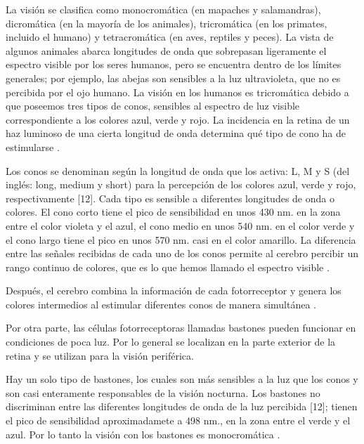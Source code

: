 \documentclass[10pt]{article}
\begin{document}
\setlength{\parskip}{2mm}

La visión se clasifica como monocromática (en mapaches y salamandras), dicromática (en la mayoría de los animales), tricromática (en los primates, incluido el humano) y tetracromática (en aves, reptiles y peces). La vista de algunos animales abarca longitudes de onda que sobrepasan ligeramente el espectro visible por los seres humanos, pero se encuentra dentro de los límites generales; por ejemplo, las abejas son sensibles a la luz ultravioleta, que no es percibida por el ojo humano. La visión en los humanos es tricromática debido a que poseemos tres tipos de conos, sensibles al espectro de luz visible correspondiente a los colores azul, verde y rojo. La incidencia en la retina de un haz luminoso de una cierta longitud de onda determina qué tipo de cono ha de estimularse \cite{IEEEreferencias:Ref12}.

\setlength{\parskip}{2mm}

Los conos se denominan según la longitud de onda que los activa: L, M y S (del inglés: long, medium y short) para la percepción de los colores azul, verde y rojo, respectivamente [12]. Cada tipo es sensible a diferentes longitudes de onda o colores. El cono corto tiene el pico de sensibilidad en unos 430 nm. en la zona entre el color violeta y el azul, el cono medio en unos 540 nm. en el color verde y el cono largo tiene el pico en unos 570 nm. casi en el color amarillo. La diferencia entre las señales recibidas de cada uno de los conos permite al cerebro percibir un rango continuo de colores, que es lo que hemos llamado el espectro visible \cite{IEEEreferencias:Ref13}.

\setlength{\parskip}{2mm}

Después, el cerebro combina la información de cada fotorreceptor y genera los colores intermedios al estimular diferentes conos de manera simultánea \cite{IEEEreferencias:Ref12}.

\setlength{\parskip}{2mm}

Por otra parte, las células fotorreceptoras llamadas bastones pueden funcionar en condiciones de poca luz. Por lo general se localizan en la parte exterior de la retina y se utilizan para la visión periférica.

\setlength{\parskip}{2mm}

Hay un solo tipo de bastones, los cuales son más sensibles a la luz que los conos y son casi enteramente responsables de la visión nocturna. Los bastones no discriminan entre las diferentes longitudes de onda de la luz percibida [12]; tienen el pico de sensibilidad aproximadamete a 498 nm., en la zona entre el verde y el azul. Por lo tanto la visión con los bastones es monocromática \cite{IEEEreferencias:Ref13}.
\end{document}
